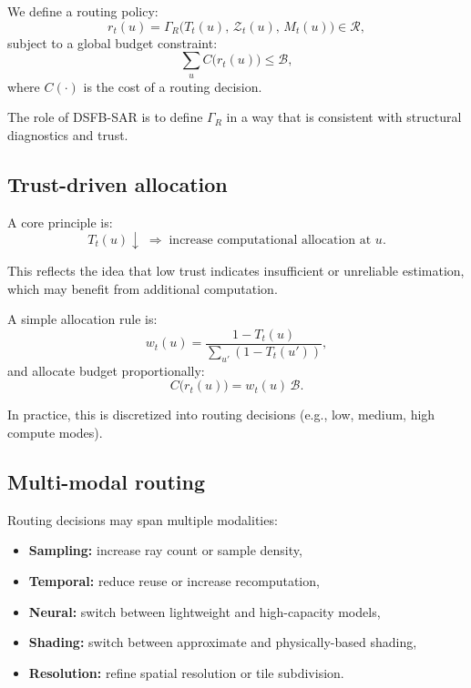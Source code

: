 \documentclass[11pt,letterpaper]{article}
\theoremstyle{gcresult}
\theoremstyle{definition}
\begin{document}
We define a routing policy:
\begin{equation}
r_t(u)=\Gamma_R\!\bigl(T_t(u),\,\mathcal{Z}_t(u),\,M_t(u)\bigr)\in\mathcal{R},
\end{equation}
subject to a global budget constraint:
\begin{equation}
\sum_{u} C\bigl(r_t(u)\bigr) \le \mathcal{B},
\end{equation}
where $C(\cdot)$ is the cost of a routing decision.

The role of DSFB-SAR is to define $\Gamma_R$ in a way that is consistent with structural diagnostics and trust.


\subsection{Trust-driven allocation}

A core principle is:
\begin{equation}
T_t(u)\downarrow \;\Rightarrow\; \text{increase computational allocation at }u.
\end{equation}

This reflects the idea that low trust indicates insufficient or unreliable estimation, which may benefit from additional computation.

A simple allocation rule is:
\begin{equation}
w_t(u)=\frac{1 - T_t(u)}{\sum_{u'} (1 - T_t(u'))},
\end{equation}
and allocate budget proportionally:
\begin{equation}
C\bigl(r_t(u)\bigr)=w_t(u)\,\mathcal{B}.
\end{equation}

In practice, this is discretized into routing decisions (e.g., low, medium, high compute modes).


\subsection{Multi-modal routing}

Routing decisions may span multiple modalities:
\begin{itemize}[leftmargin=1.5em]
    \item \textbf{Sampling:} increase ray count or sample density,
    \item \textbf{Temporal:} reduce reuse or increase recomputation,
    \item \textbf{Neural:} switch between lightweight and high-capacity models,
    \item \textbf{Shading:} switch between approximate and physically-based shading,
    \item \textbf{Resolution:} refine spatial resolution or tile subdivision.
\end{itemize}
\end{document}
